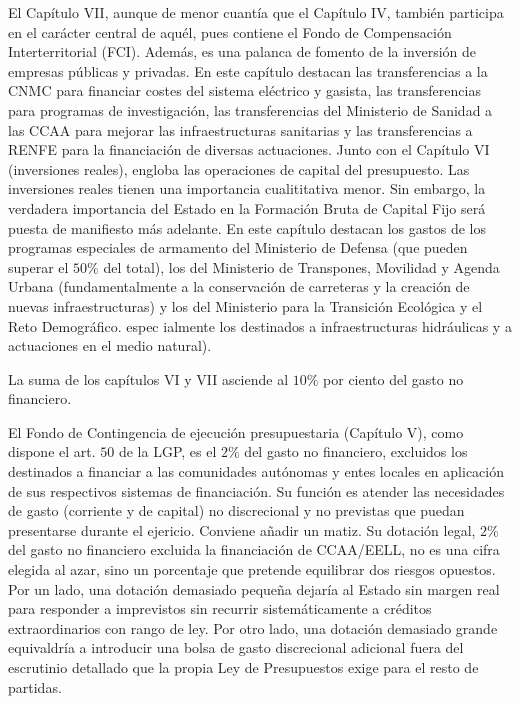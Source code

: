 \documentclass[10pt,a4paper]{article}
\begin{document}
El Capítulo VII, aunque de menor cuantía que el Capítulo IV, también participa en el carácter central de aquél, pues contiene el Fondo de Compensación Interterritorial (FCI). Además, es una palanca de fomento de la inversión de empresas públicas y privadas. En este capítulo destacan las transferencias a la CNMC para financiar costes del sistema eléctrico y gasista, las transferencias para programas de investigación, las transferencias del Ministerio de Sanidad a las CCAA para mejorar las infraestructuras sanitarias y las transferencias a RENFE para la financiación de diversas actuaciones. Junto con el Capítulo VI (inversiones reales), engloba las operaciones de capital del presupuesto. Las inversiones reales tienen una importancia cualititativa menor. Sin embargo, la verdadera importancia del Estado en la Formación Bruta de Capital Fijo será puesta de manifiesto más adelante. En este capítulo destacan los gastos de los programas especiales de armamento del Ministerio de Defensa (que pueden superar el $50\%$ del total), los del Ministerio de Transpones, Movilidad y Agenda Urbana (fundamentalmente a la conservación de carreteras y la creación de nuevas infraestructuras) y los del Ministerio para la Transición Ecológica y el Reto Demográfico. espec ialmente los destinados a infraestructuras hidráulicas y a actuaciones en el medio natural).

La suma de los capítulos VI y VII asciende al $10\%$ por ciento del gasto no financiero. 

El Fondo de Contingencia de ejecución presupuestaria (Capítulo V), como dispone el art. $50$ de la LGP, es el $2\%$ del gasto no financiero, excluidos los destinados a financiar a las comunidades autónomas y entes locales en aplicación de sus respectivos sistemas de financiación. Su función es atender las necesidades de gasto (corriente y de capital) no discrecional y no previstas que puedan presentarse durante el ejericio. Conviene añadir un matiz. Su dotación legal, $2\%$ del gasto no financiero excluida la financiación de CCAA/EELL, no es una cifra elegida al azar, sino un porcentaje que pretende equilibrar dos riesgos opuestos. Por un lado, una dotación demasiado pequeña dejaría al Estado sin margen real para responder a imprevistos sin recurrir sistemáticamente a créditos extraordinarios con rango de ley. Por otro lado, una dotación demasiado grande equivaldría a introducir una bolsa de gasto discrecional adicional fuera del escrutinio detallado que la propia Ley de Presupuestos exige para el resto de partidas.
\end{document}
